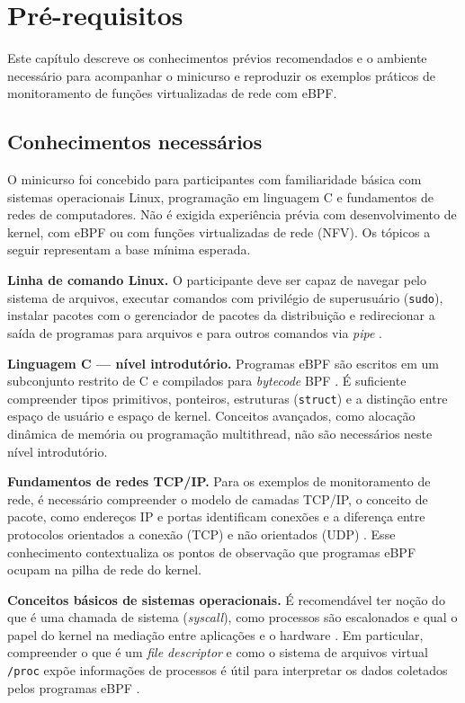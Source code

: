 \chapter{Pré-requisitos}

Este capítulo descreve os conhecimentos prévios recomendados e o ambiente necessário
para acompanhar o minicurso e reproduzir os exemplos práticos de monitoramento de
funções virtualizadas de rede com eBPF.

\section{Conhecimentos necessários}

O minicurso foi concebido para participantes com familiaridade básica com sistemas
operacionais Linux, programação em linguagem C e fundamentos de redes de computadores.
Não é exigida experiência prévia com desenvolvimento de kernel, com eBPF ou com
funções virtualizadas de rede (NFV).
Os tópicos a seguir representam a base mínima esperada.

\textbf{Linha de comando Linux.}
O participante deve ser capaz de navegar pelo sistema de arquivos, executar comandos
com privilégio de superusuário (\texttt{sudo}), instalar pacotes com o gerenciador
de pacotes da distribuição e redirecionar a saída de programas para arquivos e
para outros comandos via \textit{pipe} \cite{manpages2024}.

\textbf{Linguagem C --- nível introdutório.}
Programas eBPF são escritos em um subconjunto restrito de C e compilados para
\textit{bytecode} BPF \cite{linuxkernel2024}.
É suficiente compreender tipos primitivos, ponteiros, estruturas (\texttt{struct})
e a distinção entre espaço de usuário e espaço de kernel.
Conceitos avançados, como alocação dinâmica de memória ou programação multithread,
não são necessários neste nível introdutório.

\textbf{Fundamentos de redes TCP/IP.}
Para os exemplos de monitoramento de rede, é necessário compreender o modelo de
camadas TCP/IP, o conceito de pacote, como endereços IP e portas identificam
conexões e a diferença entre protocolos orientados a conexão (TCP) e não orientados
(UDP) \cite{gregg2019}.
Esse conhecimento contextualiza os pontos de observação que programas eBPF ocupam
na pilha de rede do kernel.

\textbf{Conceitos básicos de sistemas operacionais.}
É recomendável ter noção do que é uma chamada de sistema (\textit{syscall}), como
processos são escalonados e qual o papel do kernel na mediação entre aplicações e
o hardware \cite{gregg2020}.
Em particular, compreender o que é um \textit{file descriptor} e como o sistema
de arquivos virtual \texttt{/proc} expõe informações de processos é útil para
interpretar os dados coletados pelos programas eBPF \cite{manpages2024}.


